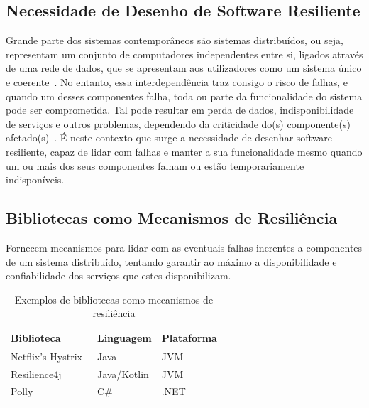 \subsection{Necessidade de Desenho de Software Resiliente}
Grande parte dos sistemas contemporâneos são sistemas distribuídos, ou seja, representam um conjunto de computadores independentes entre si, ligados através de uma rede de dados, que se apresentam aos utilizadores como um sistema único e coerente~\cite{fcc-distributed-systems}.
No entanto, essa interdependência traz consigo o risco de falhas, e quando um desses componentes falha, toda ou parte da funcionalidade do sistema pode ser comprometida.
Tal pode resultar em perda de dados, indisponibilidade de serviços e outros problemas, dependendo da criticidade do(s) componente(s) afetado(s)~\cite{cap-theorem}.
É neste contexto que surge a necessidade de desenhar software resiliente, capaz de lidar com falhas e manter a sua funcionalidade mesmo quando um ou mais dos seus componentes falham ou estão temporariamente indisponíveis.


\subsection{Bibliotecas como Mecanismos de Resiliência}
Fornecem mecanismos para lidar com as eventuais falhas inerentes a componentes de um sistema distribuído, tentando garantir ao máximo a
disponibilidade e confiabilidade dos serviços que estes disponibilizam.

\begin{table}[h]
    \centering
    \label{tab:resilience_libraries}
    \begin{tabular}{|l|l|l|}
        \hline
        \textbf{Biblioteca}                      & \textbf{Linguagem} & \textbf{Plataforma} \\ \hline
        Netflix's Hystrix~\cite{netflix-hystrix} & Java               & JVM                 \\ \hline
        Resilience4j~\cite{resilience4j}         & Java/Kotlin        & JVM                 \\ \hline
        Polly~\cite{polly-dotnet}                & C\#                & .NET                \\ \hline
    \end{tabular}
    \caption{Exemplos de bibliotecas como mecanismos de resiliência}
\end{table}

